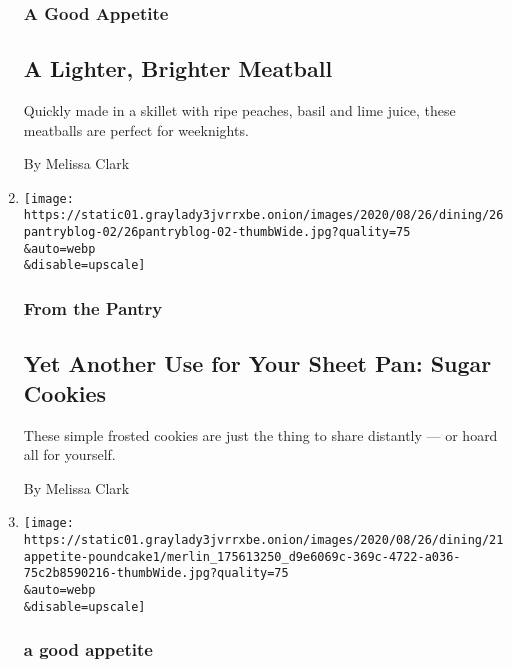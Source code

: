 \begin{enumerate}
  \hypertarget{a-good-appetite-2}{%
  \subsubsection{A Good Appetite}\label{a-good-appetite-2}}

  \hypertarget{a-lighter-brighter-meatball}{%
  \subsection{A Lighter, Brighter
  Meatball}\label{a-lighter-brighter-meatball}}

  Quickly made in a skillet with ripe peaches, basil and lime juice,
  these meatballs are perfect for weeknights.

  By Melissa Clark
\item
  \href{/2020/08/26/dining/sheet-pan-sugar-cookies.html}{}

  \texttt{[image: https://static01.graylady3jvrrxbe.onion/images/2020/08/26/dining/26pantryblog-02/26pantryblog-02-thumbWide.jpg?quality=75\\\&auto=webp\\\&disable=upscale]}

  \hypertarget{from-the-pantry-2}{%
  \subsubsection{From the Pantry}\label{from-the-pantry-2}}

  \hypertarget{yet-another-use-for-your-sheet-pan-sugar-cookies}{%
  \subsection{Yet Another Use for Your Sheet Pan: Sugar
  Cookies}\label{yet-another-use-for-your-sheet-pan-sugar-cookies}}

  These simple frosted cookies are just the thing to share distantly ---
  or hoard all for yourself.

  By Melissa Clark
\item
  \href{/2020/08/21/dining/poundcake-recipe.html}{}

  \texttt{[image: https://static01.graylady3jvrrxbe.onion/images/2020/08/26/dining/21appetite-poundcake1/merlin\_175613250\_d9e6069c-369c-4722-a036-75c2b8590216-thumbWide.jpg?quality=75\\\&auto=webp\\\&disable=upscale]}

  \hypertarget{a-good-appetite-3}{%
  \subsubsection{a good appetite}\label{a-good-appetite-3}}


\end{enumerate}
